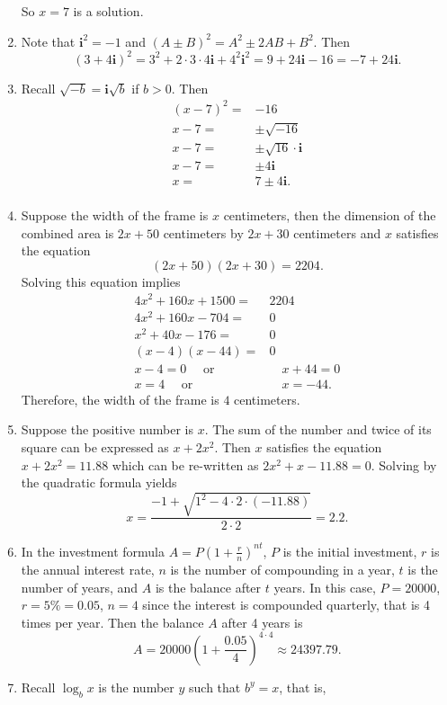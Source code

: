 \documentclass[
  12pt]{article}
\begin{document}
\begin{enumerate}
  So \(x=7\) is a solution.
\item
  Note that \(\mathbf{i}^2=-1\) and \((A\pm B)^2=A^2\pm 2AB+B^2\). Then
  \[(3+4\mathbf{i})^2=3^2+2\cdot 3\cdot 4\mathbf{i}+4^2\mathbf{i}^2=9+24\mathbf{i}-16=-7+24\mathbf{i}.\]
\item
  Recall \(\sqrt{-b}=\mathbf{i}\sqrt{b}\) if \(b>0\). Then \[
  \begin{aligned}
  (x-7)^2=&-16\\
  x-7=&\pm\sqrt{-16}\\
  x-7=&\pm\sqrt{16}\cdot\mathbf{i}\\
  x-7=&\pm4\mathbf{i}\\
  x=&7\pm4\mathbf{i}.\\
  \end{aligned}
  \]
\item
  Suppose the width of the frame is \(x\) centimeters, then the
  dimension of the combined area is \(2x+50\) centimeters by \(2x+30\)
  centimeters and \(x\) satisfies the equation \[(2x+50)(2x+30)=2204.\]
  Solving this equation implies \[
  \begin{aligned}
  4x^2+160x+1500=&2204\\
  4x^2+160x-704=&0\\
  x^2+40x-176=&0\\
  (x-4)(x-44)=&0\\
  x-4=0\quad\text{ or}&\quad x+44=0\\
  x=4\quad\text{ or}&\quad x=-44.
  \end{aligned}
  \] Therefore, the width of the frame is \(4\) centimeters.
\item
  Suppose the positive number is \(x\). The sum of the number and twice
  of its square can be expressed as \(x+2x^2\). Then \(x\) satisfies the
  equation \(x+2x^2=11.88\) which can be re-written as
  \(2x^2+x-11.88=0\). Solving by the quadratic formula yields
  \[x=\frac{-1+\sqrt{1^2-4\cdot 2\cdot (-11.88)}}{2\cdot 2}=2.2.\]
\item
  In the investment formula \(A=P(1+\frac{r}{n})^{nt}\), \(P\) is the
  initial investment, \(r\) is the annual interest rate, \(n\) is the
  number of compounding in a year, \(t\) is the number of years, and
  \(A\) is the balance after \(t\) years. In this case, \(P=20000\),
  \(r=5\%=0.05\), \(n=4\) since the interest is compounded quarterly,
  that is 4 times per year. Then the balance \(A\) after 4 years is
  \[A=20000\left(1+\frac{0.05}{4}\right)^{4\cdot 4}\approx 24397.79.\]
\item
  Recall \(\log_bx\) is the number \(y\) such that \(b^y=x\), that is,

\end{enumerate}
\end{document}
